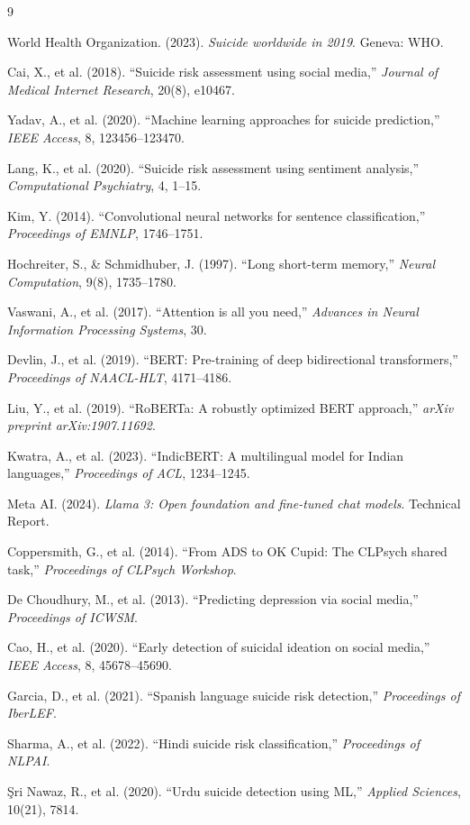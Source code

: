 \documentclass[12pt,a4paper]{article}
\begin{document}
\begin{thebibliography}{9}

World Health Organization. (2023). \textit{Suicide worldwide in 2019}. Geneva: WHO.

Cai, X., et al. (2018). ``Suicide risk assessment using social media,'' \textit{Journal of Medical Internet Research}, 20(8), e10467.

Yadav, A., et al. (2020). ``Machine learning approaches for suicide prediction,'' \textit{IEEE Access}, 8, 123456--123470.

Lang, K., et al. (2020). ``Suicide risk assessment using sentiment analysis,'' \textit{Computational Psychiatry}, 4, 1--15.

Kim, Y. (2014). ``Convolutional neural networks for sentence classification,'' \textit{Proceedings of EMNLP}, 1746--1751.

Hochreiter, S., \& Schmidhuber, J. (1997). ``Long short-term memory,'' \textit{Neural Computation}, 9(8), 1735--1780.

Vaswani, A., et al. (2017). ``Attention is all you need,'' \textit{Advances in Neural Information Processing Systems}, 30.

Devlin, J., et al. (2019). ``BERT: Pre-training of deep bidirectional transformers,'' \textit{Proceedings of NAACL-HLT}, 4171--4186.

Liu, Y., et al. (2019). ``RoBERTa: A robustly optimized BERT approach,'' \textit{arXiv preprint arXiv:1907.11692}.

Kwatra, A., et al. (2023). ``IndicBERT: A multilingual model for Indian languages,'' \textit{Proceedings of ACL}, 1234--1245.

Meta AI. (2024). \textit{Llama 3: Open foundation and fine-tuned chat models}. Technical Report.

Coppersmith, G., et al. (2014). ``From ADS to OK Cupid: The CLPsych shared task,'' \textit{Proceedings of CLPsych Workshop}.

De Choudhury, M., et al. (2013). ``Predicting depression via social media,'' \textit{Proceedings of ICWSM}.

Cao, H., et al. (2020). ``Early detection of suicidal ideation on social media,'' \textit{IEEE Access}, 8, 45678--45690.

Garcia, D., et al. (2021). ``Spanish language suicide risk detection,'' \textit{Proceedings of IberLEF}.

Sharma, A., et al. (2022). ``Hindi suicide risk classification,'' \textit{Proceedings of NLPAI}.

Şri Nawaz, R., et al. (2020). ``Urdu suicide detection using ML,'' \textit{Applied Sciences}, 10(21), 7814.

\end{thebibliography}
\end{document}
